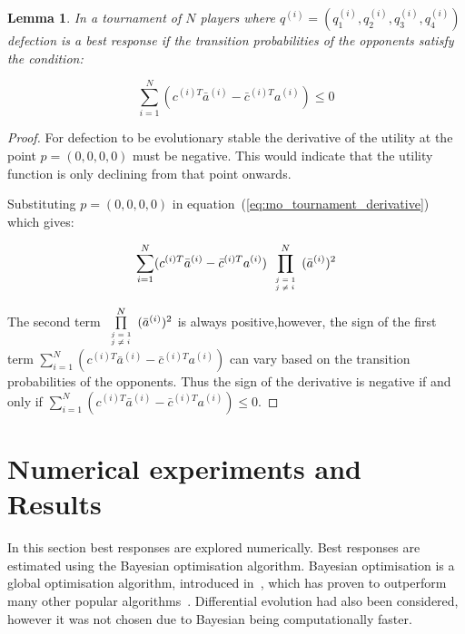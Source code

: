 \documentclass[10pt]{article}
\newtheorem{lemma}[theorem]{Lemma}
\begin{document}
\begin{lemma}\label{lemma:stability_of_defection}
    In a tournament of \(N\) players where \(q^{(i)} = (q_{1}^{(i)}, q_{2}^{(i)}, q_{3}^{(i)}, q_{4}^{(i)})\)
    defection is a best response if the transition probabilities of the
    opponents satisfy the condition:

    \begin{equation}
        \sum_{i=1} ^ N (c^{(i)T} \bar{a}^{(i)} - \bar{c}^{(i)T} a^{(i)}) \leq 0
    \end{equation}
\end{lemma}

\begin{proof}
    For defection to be evolutionary stable the derivative of the utility
    at the point \(p = (0, 0, 0, 0)\) must be negative. This would indicate that
    the utility function is only declining from that point onwards.

    Substituting \(p = (0, 0, 0, 0)\) in
    equation~(\ref{eq:mo_tournament_derivative}) which gives:

    \begin{equation}
    \sum_{i=1} ^ N (c^{(i)T} \bar{a}^{(i)} - \bar{c}^{(i)T} a^{(i)})
    \prod\limits_{\tiny\begin{array}{l} j=1 \\ j \neq i \end{array}} ^ N (\bar{a}^{(i)})^2
    \end{equation}
    
    The second term \(\prod\limits_{\tiny\begin{array}{l} j=1 \\ j \neq i
    \end{array}} ^ N (\bar{a}^{(i)})^2\) is always positive,however, the sign of the
    first term \(\sum_{i=1} ^ N (c^{(i)T} \bar{a}^{(i)} - \bar{c}^{(i)T} a^{(i)})\)
    can vary based on the transition probabilities of the opponents. Thus the
    sign of the derivative is negative if and only if
    \(\sum_{i=1} ^ N (c^{(i)T} \bar{a}^{(i)} - \bar{c}^{(i)T} a^{(i)}) \leq 0\).
\end{proof}


\section{Numerical experiments and Results} \label{section:numerical_experiments}

In this section best responses are explored numerically. Best responses are
estimated using the Bayesian optimisation algorithm. Bayesian optimisation is a
global optimisation algorithm, introduced in~\cite{Mokus1978}, which has proven
to outperform many other popular algorithms~\cite{Jones2001}. Differential
evolution had also been considered, however it was not chosen due to Bayesian
being computationally faster.
\end{document}
